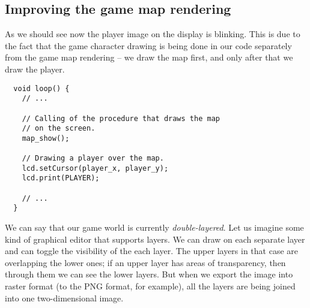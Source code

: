\documentclass[../sparc.tex]{subfiles}
\begin{document}
\subsection{Improving the game map rendering}

As we should see now the player image on the display is blinking.  This is due
to the fact that the game character drawing is being done in our code separately
from the game map rendering -- we draw the map first, and only after that we draw
the player.

\begin{verbatim}
  void loop() {
    // ...

    // Calling of the procedure that draws the map
    // on the screen.
    map_show();

    // Drawing a player over the map.
    lcd.setCursor(player_x, player_y);
    lcd.print(PLAYER);

    // ...
  }
\end{verbatim}

We can say that our game world is currently \emph{double-layered}.  Let us
imagine some kind of graphical editor that supports layers.  We can draw on each
separate layer and can toggle the visibility of the each layer.  The upper
layers in that case are overlapping the lower ones; if an upper layer has areas
of transparency, then through them we can see the lower layers.  But when we
export the image into raster format (to the PNG format, for example), all the
layers are being joined into one two-dimensional image.
\end{document}
